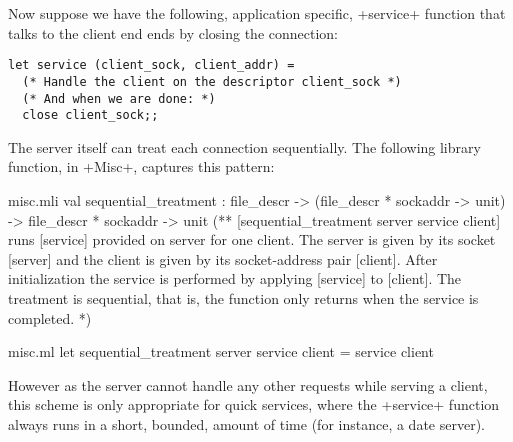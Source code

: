 Now suppose we have the following, application specific, \ml+service+
function that talks to the client end ends by closing the connection:
%
\begin{lstlisting}
let service (client_sock, client_addr) =
  (* Handle the client on the descriptor client_sock *)
  (* And when we are done: *)
  close client_sock;;
\end{lstlisting}
%

The server itself can treat each connection sequentially. The
following library function, in \ml+Misc+, captures this pattern:
\begin{codefile}{misc.mli}
val sequential_treatment :
file_descr -> (file_descr * sockaddr -> unit) ->
file_descr * sockaddr -> unit
(** [sequential_treatment server service client] runs [service] provided
      on server for one client. The server is given by its socket [server]
      and the client is given by its socket-address pair [client]. After
      initialization the service is performed by applying [service] to
      [client]. The treatment is sequential, that is, the function only
      returns when the service is completed. *)
\end{codefile}
%
\begin{listingcodefile}{misc.ml}
let sequential_treatment server service client = service client
\end{listingcodefile}
However as the server cannot handle any other requests while serving a client,
this scheme is only appropriate for quick services, where the
\ml+service+ function always runs in a short, bounded, amount of time (for
instance, a date server).

